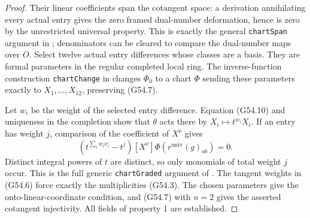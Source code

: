 \begin{proof}
Their linear coefficients span the cotangent space:
a derivation annihilating every actual entry gives the
zero framed dual-number deformation, hence is zero by
the unrestricted universal property.  This is exactly
the general \texttt{chartSpan} argument in
; denominators can
be cleared to compare the dual-number maps over $O$.
Select twelve actual entry differences whose classes
are a basis.  They are formal parameters in the regular
completed local ring.  The inverse-function construction
\texttt{chartChange} in
 changes
$\Phi_0$ to a chart $\Phi$ sending these parameters
exactly to $X_1,\ldots,X_{12}$, preserving (G54.7).

Let $w_i$ be the weight of the selected entry difference.
Equation (G54.10) and uniqueness in the completion show
that $\theta$ acts there by $X_i\mapsto t^{w_i}X_i$.
If an entry has weight $j$, comparison of the coefficient
of $X^\nu$ gives
\[
   (t^{\sum_iw_i\nu_i}-t^j)[X^\nu]\Phi(r^{\mathrm{univ}}(g)_{ab})=0.
                                                               \tag{G54.11}
\]
Distinct integral powers of $t$ are distinct, so only
monomials of total weight $j$ occur.  This is the full
generic \texttt{chartGraded} argument of
.
The tangent weights in (G54.6) force exactly the
multiplicities (G54.3).  The chosen parameters give
the onto-linear-coordinate condition, and (G54.7)
with $n=2$ gives the asserted cotangent injectivity.
All fields of property 1 are established.
\end{proof}


